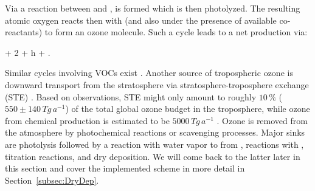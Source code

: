\documentclass[gmd, manuscript]{copernicus}
\begin{document}
Via a reaction between  and ,  is formed which is then photolyzed. The resulting atomic oxygen reacts then with  (and also under the presence of available co-reactants) to form an ozone molecule.
Such a cycle leads to a net production via:
\begin{reaction}
   + 2 + h\nu \rightarrow {} + .
\end{reaction}
Similar cycles involving VOCs exist \citep{ACP:Monks2015}. Another source of tropospheric ozone is downward transport from the stratosphere via stratosphere-troposphere exchange (STE) \citep{WMO2014}. Based on observations, STE might only amount to roughly $10\,\unit{\%}$ ($550 \pm 140\,\unit{Tg\,a^{-1}}$) of the total global ozone budget in the troposphere, while ozone from chemical production is estimated to be $5000\,\unit{Tg\,a^{-1}}$ \citep{ACP:Monks2015}. Ozone is removed from the atmosphere by photochemical reactions or scavenging processes. Major sinks are photolysis followed by a reaction with water vapor to from ,
reactions with , titration reactions, and dry deposition. We will come back to the latter later in this section and cover the implemented scheme in more detail in Section~\ref{subsec:DryDep}.
\end{document}
